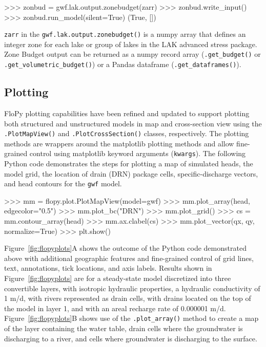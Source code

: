 \documentclass[12pt, oneside]{article}  	%
\begin{document}
\begin{python}
>>> zonbud = gwf.lak.output.zonebudget(zarr)
>>> zonbud.write_input()
>>> zonbud.run_model(silent=True)
(True, [])
\end{python}

\noindent \texttt{zarr} in the \texttt{gwf.lak.output.zonebudget()} is a numpy array that defines an integer zone for each lake or group of lakes in the LAK advanced stress package. Zone Budget output can be returned as a numpy record array (\texttt{.get\_budget()} or \texttt{.get\_volumetric\_budget()}) or a Pandas dataframe (\texttt{.get\_dataframes()}).

\subsection*{Plotting} \label{sec:plotting}

FloPy plotting capabilities have been refined and updated to support plotting both structured and unstructured models in map and cross-section view using the \texttt{.PlotMapView()} and \texttt{.PlotCrossSection()} classes, respectively. The plotting methods are wrappers around the matplotlib plotting methods \citep{hunter2007matplotlib} and allow fine-grained control using matplotlib keyword arguments (\texttt{kwargs}). The following Python code demonstrates the steps for plotting a map of simulated heads, the model grid, the location of drain (DRN) package cells, specific-discharge vectors, and head contours for the \texttt{gwf} model.

\begin{python}
>>> mm = flopy.plot.PlotMapView(model=gwf)
>>> mm.plot_array(head, edgecolor="0.5")
>>> mm.plot_bc("DRN")
>>> mm.plot_grid()
>>> cs = mm.contour_array(head)
>>> mm.ax.clabel(cs)
>>> mm.plot_vector(qx, qy, normalize=True)
>>> plt.show()
\end{python}

\noindent Figure~\ref{fig:flopyplots}A shows the outcome of the Python code demonstrated above with additional geographic features and fine-grained control of grid lines, text, annotations, tick locations, and axis labels. Results shown in Figure~\ref{fig:flopyplots} are for a steady-state model discretized into three convertible layers, with isotropic hydraulic properties, a hydraulic conductivity of 1 m/d, with rivers represented as drain cells, with drains located on the top of the model in layer 1, and with an areal recharge rate of 0.000001 m/d. Figure~\ref{fig:flopyplots}B shows use of the \texttt{.plot\_array()} method to create a map of the layer containing the water table, drain cells where the groundwater is discharging to a river, and cells where groundwater is discharging to the surface.
\end{document}
